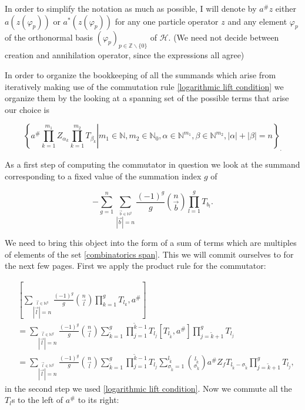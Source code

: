 \documentclass[b5paper,draft,openbib,12pt]{memoir}
\begin{document}
 In order to simplify the notation as much as possible, 
I will denote by \(a^\# z\) either \(a(z(\varphi_p))\) or
 \(a^*(z(\varphi_p))\) for any one particle operator \(z\) and any element
 \(\varphi_p\) of the orthonormal basis \((\varphi_p)_{p\in\mathbb{Z}\backslash\{0\}}\) of
 \(\mathcal{H}\). (We need not decide between creation and annihilation 
 operator, since the expressions all agree)
 
In order to organize the bookkeeping of all the summands which arise from iteratively
making use of the commutation rule \eqref{logarithmic lift condition} we organize them 
by the looking at a spanning set of the possible terms that arise 
our choice is

\begin{equation}\label{combinatorics span}
\left\{ \left. a^\# \prod_{k=1}^{m_1} Z_{\alpha_k} \prod_{k=1}^{m_2}T_{\beta_k} \right|
m_1\in\mathbb{N},m_2\in\mathbb{N}_0, \alpha\in \mathbb{N}^{m_1}, 
\beta \in \mathbb{N}^{m_2}, |\alpha|+|\beta|=n\right\}_.
\end{equation}

As a first step of computing the commutator in question we look at the summand
corresponding to a fixed value of the summation index \(g\) of 

\begin{equation}\label{combinatorics total sum of T}
-\sum_{g=1}^n \sum_{\stackrel{\vec{b}\in\mathbb{N}^g}{|\vec{b}|=n}}\frac{(-1)^g}{g} 
\binom{n}{\vec{b}} \prod_{l=1}^g T_{b_l}.
\end{equation}

 We need to bring this object into the form of a sum
of terms which are multiples of elements of the set \eqref{combinatorics span}.
This we will commit ourselves to for the next few pages. First we apply
the product rule for the commutator:

\begin{align*}
&\left[ \sum_{\stackrel{\vec{l}\in\mathbb{N}^g}{|\vec{l}|=n}} \frac{(-1)^g}{g} \binom{n}{\vec{l}}
 \prod_{k=1}^g T_{l_k},a^\#\right]\\
 &= \sum_{\stackrel{\vec{l}\in\mathbb{N}^g}{|\vec{l}|=n}} \frac{(-1)^g}{g} \binom{n}{\vec{l}}
 \sum_{\tilde{k}=1}^g \prod_{j=1}^{\tilde{k}-1} T_{l_j} 
 \left[ T_{l_{\tilde{k}}},a^\#\right] \prod_{j=\tilde{k}+1}^g T_{l_j}\\
&=\sum_{\stackrel{\vec{l}\in\mathbb{N}^g}{|\vec{l}|=n}} \frac{(-1)^g}{g} \binom{n}{\vec{l}}
 \sum_{\tilde{k}=1}^g \prod_{j=1}^{\tilde{k}-1} T_{l_j} 
\sum_{\sigma_{\tilde{k}}=1}^{l_{\tilde{k}}} \binom{l_{\tilde{k}}}{\sigma_{\tilde{k}}} 
a^\# Z_f T_{l_{\tilde{k}}-\sigma_{\tilde{k}}} \prod_{j=\tilde{k}+1}^g T_{l_j},
\end{align*}
in the second step we used \eqref{logarithmic lift condition}. Now we commute
all the \(T_l\)s to the left of \(a^\#\) to its right:
\end{document}
